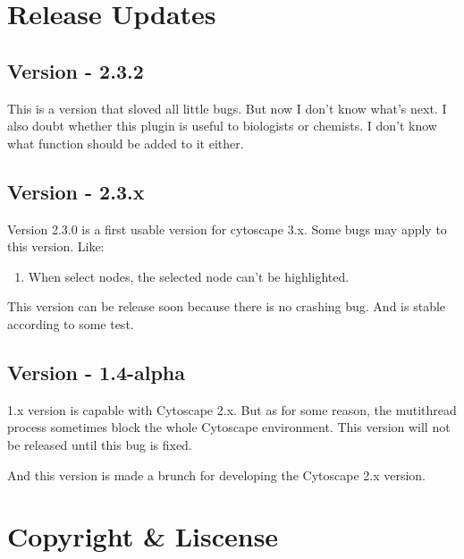\documentclass{article}
\begin{document}
\section{Release Updates}

\subsection{Version - 2.3.2}
This is a version that sloved all little bugs. But now I don't know what's next.
I also doubt whether this plugin is useful to biologists or chemists. I don't
know what function should be added to it either.

\subsection{Version - 2.3.x}
Version 2.3.0 is a first usable version for cytoscape 3.x. Some bugs may apply
to this version. Like:
\begin{enumerate}
  \item When select nodes, the selected node can't be highlighted.
\end{enumerate}
This version can be release soon because there is no crashing bug. And is stable
according to some test. 

\subsection{Version - 1.4-alpha}
1.x version is capable with Cytoscape 2.x. But as for some reason, the
mutithread process sometimes block the whole Cytoscape environment. This version
will not be released until this bug is fixed.

And this version is made a brunch for developing the Cytoscape 2.x version.

\section{Copyright \& Liscense}
\end{document}
